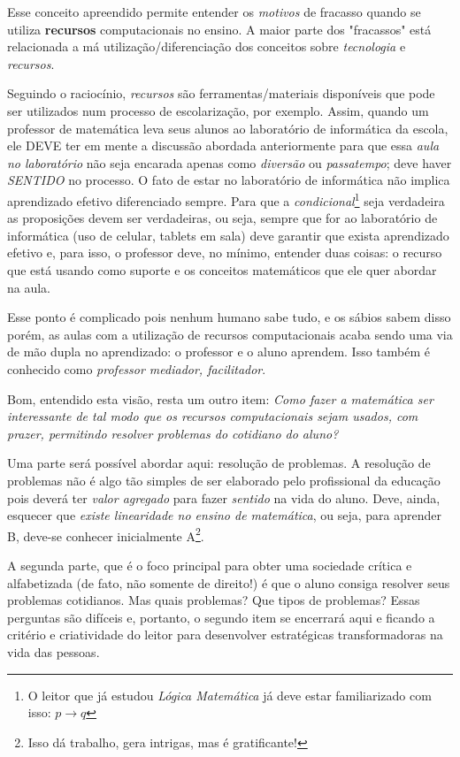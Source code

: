 Esse conceito apreendido permite entender os \textit{motivos} de fracasso quando se utiliza \textbf{recursos} computacionais no ensino. A maior parte dos "fracassos" está relacionada a má utilização/diferenciação dos conceitos sobre \textit{tecnologia} e \textit{recursos}.

Seguindo o raciocínio, \textit{recursos} são ferramentas/materiais disponíveis que pode ser utilizados num processo de escolarização, por exemplo. Assim, quando um professor de matemática leva seus alunos ao laboratório de informática da escola, ele DEVE ter em mente a discussão abordada anteriormente para que essa \textit{aula no laboratório} não seja encarada apenas como \textit{diversão} ou \textit{passatempo}; deve haver \textit{SENTIDO} no processo. O fato de estar no laboratório de informática não implica aprendizado efetivo diferenciado sempre. Para que a \textit{condicional}\footnote{O leitor que já estudou \textit{Lógica Matemática} já deve estar familiarizado com isso: $p \rightarrow q$} seja verdadeira as proposições devem ser verdadeiras, ou seja, sempre que for ao laboratório de informática (uso de celular, tablets em sala) deve garantir que exista aprendizado efetivo e, para isso, o professor deve, no mínimo, entender duas coisas: o recurso que está usando como suporte e os conceitos matemáticos que ele quer abordar na aula.

Esse ponto é complicado pois nenhum humano sabe tudo, e os sábios sabem disso porém, as aulas com a utilização de recursos computacionais acaba sendo uma via de mão dupla no aprendizado: o professor e o aluno aprendem. Isso também é conhecido como \textit{professor mediador, facilitador}.

Bom, entendido esta visão, resta um outro item: \textit{Como fazer a matemática ser interessante de tal modo que os recursos computacionais sejam usados, com prazer, permitindo resolver problemas do cotidiano do aluno?}

Uma parte será possível abordar aqui: resolução de problemas. A resolução de problemas não é algo tão simples de ser elaborado pelo profissional da educação pois deverá ter \textit{valor agregado} para fazer \textit{sentido} na vida do aluno. Deve, ainda, esquecer que \textit{existe linearidade no ensino de matemática}, ou seja, para aprender B, deve-se conhecer inicialmente A\footnote{Isso dá trabalho, gera intrigas, mas é gratificante!}.

A segunda parte, que é o foco principal para obter uma sociedade crítica e alfabetizada (de fato, não somente de direito!) é que o aluno consiga resolver seus problemas cotidianos. Mas quais problemas? Que tipos de problemas? Essas perguntas são difíceis e, portanto, o segundo item se encerrará aqui e ficando a critério e criatividade do leitor para desenvolver estratégicas transformadoras na vida das pessoas.

